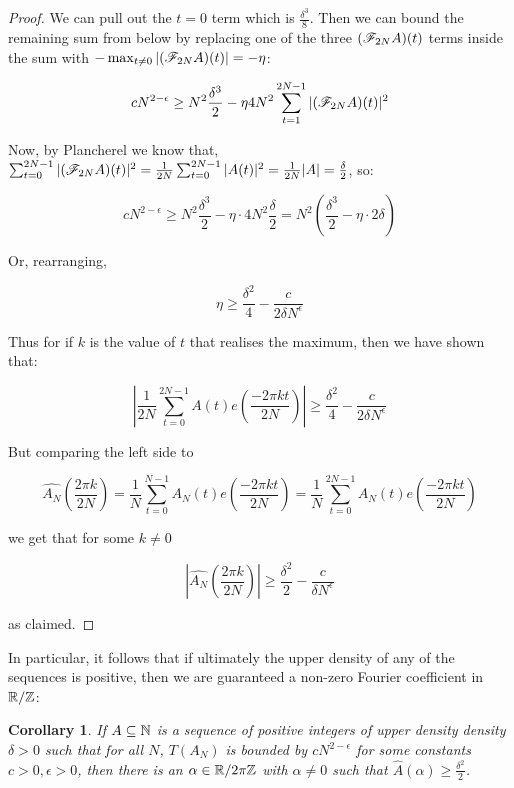 \documentclass{article}
\newtheorem{corollary}{Corollary}[theorem]
\theoremstyle{definition}
\theoremstyle{remark}
\numberwithin{equation}{section}
\begin{document}
\begin{proof}
  We can pull out the $t = 0$ term which is $\frac{\delta^3}{8}$.  Then we can
  bound the remaining sum from below by replacing one of the three
  $(\mathscr{F}_{2N} A)(t)$ terms inside the sum with
  $-\max_{t\neq 0} |(\mathscr{F}_{2N} A)(t)| = -\eta$:
  
  \[cN^{2-\epsilon} \geq N^2 \frac{\delta^3}{2} - \eta 4 N^2 \sum_{t=1}^{2N-1} |(\mathscr{F}_{2N} A)(t)|^2\]

  Now, by Plancherel we know that,
  $\sum_{t=0}^{2N-1} |(\mathscr{F}_{2N}A)(t)|^2 = \frac{1}{2N}
  \sum_{t=0}^{2N-1} |A(t)|^2 = \frac{1}{2N} |A| = \frac{\delta}{2}$,
  so:

  \[cN^{2-\epsilon} \geq N^2 \frac{\delta^3}{2} - \eta \cdot 4N^2
    \frac{\delta}{2} = N^2\left(\frac{\delta^3}{2} - \eta\cdot 2
      \delta \right)\]

  Or, rearranging, 

  \[\eta \geq \frac{\delta^2}{4} - \frac{c}{2\delta N^\epsilon}\]

  Thus for if $k$ is the value of $t$ that realises the maximum, then we
  have shown that: 
  
  \[\left|\frac{1}{2N} \sum_{t=0}^{2N-1} A(t) e(\frac{-2\pi k
        t}{2N})\right| \geq \frac{\delta^2}{4} - \frac{c}{2\delta N^\epsilon}\]
  
  But comparing the left side to 
  
  \[\widehat{A_N}(\frac{2\pi k}{2N}) = \frac{1}{N}\sum_{t=0}^{N-1} A_N(t) e(\frac{-2\pi k
      t}{2N}) = \frac{1}{N}\sum_{t=0}^{2N-1} A_N(t) e(\frac{-2\pi k
      t}{2N})\]
  
  we get that for some $k \neq 0$

  \[|\widehat{A_N}(\frac{2\pi k}{2N})| \geq \frac{\delta^2}{2} - \frac{c}{\delta
      N^\epsilon}\]

  as claimed.
\end{proof}

In particular, it follows that if ultimately the upper density of any
of the \relevant sequences is positive, then we are guaranteed a
non-zero Fourier coefficient in $\mathbb{R}/\mathbb{Z}$:

\begin{corollary}\label{thm:alpha}
  If $A \subseteq \mathbb{N}$ is a sequence of positive integers of upper
  density density $\delta > 0$ such that for all $N$, $T(A_N)$ is
  bounded by $c N^{2-\epsilon}$ for some constants
  $c > 0, \epsilon > 0$, then there is an $\alpha \in \mathbb{R}/2\pi\mathbb{Z}$ with
  $\alpha \neq 0$ such that
  $\widehat{A}(\alpha) \geq \frac{\delta^2}{2}$.
\end{corollary}
\end{document}
